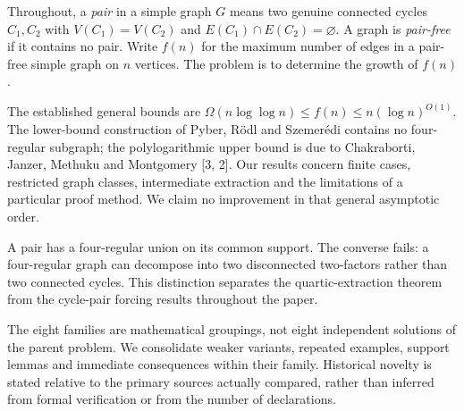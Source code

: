 \documentclass[
  11pt,
]{article}
\begin{document}
Throughout, a \emph{pair} in a simple graph \(G\) means two genuine
connected cycles \(C_1,C_2\) with \(V(C_1)=V(C_2)\) and
\(E(C_1)\cap E(C_2)=\varnothing\). A graph is \emph{pair-free} if it
contains no pair. Write \(f(n)\) for the maximum number of edges in a
pair-free simple graph on \(n\) vertices. The problem is to determine
the growth of \(f(n)\).

The established general bounds are
\(\Omega(n\log\log n)\leq f(n)\leq n(\log n)^{O(1)}\). The lower-bound
construction of Pyber, Rödl and Szemerédi contains no four-regular
subgraph; the polylogarithmic upper bound is due to Chakraborti, Janzer,
Methuku and Montgomery {[}3, 2{]}. Our results concern finite cases,
restricted graph classes, intermediate extraction and the limitations of
a particular proof method. We claim no improvement in that general
asymptotic order.

A pair has a four-regular union on its common support. The converse
fails: a four-regular graph can decompose into two disconnected
two-factors rather than two connected cycles. This distinction separates
the quartic-extraction theorem from the cycle-pair forcing results
throughout the paper.

The eight families are mathematical groupings, not eight independent
solutions of the parent problem. We consolidate weaker variants,
repeated examples, support lemmas and immediate consequences within
their family. Historical novelty is stated relative to the primary
sources actually compared, rather than inferred from formal verification
or from the number of declarations.
\end{document}
